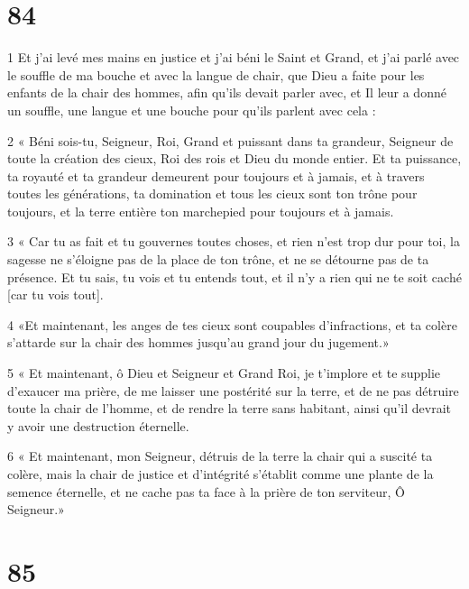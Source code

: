 \chapter{84}

\par 1 Et j'ai levé mes mains en justice et j'ai béni le Saint et Grand, et j'ai parlé avec le souffle de ma bouche et avec la langue de chair, que Dieu a faite pour les enfants de la chair des hommes, afin qu'ils devait parler avec, et Il leur a donné un souffle, une langue et une bouche pour qu'ils parlent avec cela :
\par 2 « Béni sois-tu, Seigneur, Roi, Grand et puissant dans ta grandeur, Seigneur de toute la création des cieux, Roi des rois et Dieu du monde entier. Et ta puissance, ta royauté et ta grandeur demeurent pour toujours et à jamais, et à travers toutes les générations, ta domination et tous les cieux sont ton trône pour toujours, et la terre entière ton marchepied pour toujours et à jamais.
\par 3 « Car tu as fait et tu gouvernes toutes choses, et rien n'est trop dur pour toi, la sagesse ne s'éloigne pas de la place de ton trône, et ne se détourne pas de ta présence. Et tu sais, tu vois et tu entends tout, et il n’y a rien qui ne te soit caché [car tu vois tout].
\par 4 «Et maintenant, les anges de tes cieux sont coupables d'infractions, et ta colère s'attarde sur la chair des hommes jusqu'au grand jour du jugement.»
\par 5 « Et maintenant, ô Dieu et Seigneur et Grand Roi, je t'implore et te supplie d'exaucer ma prière, de me laisser une postérité sur la terre, et de ne pas détruire toute la chair de l'homme, et de rendre la terre sans habitant, ainsi qu'il devrait y avoir une destruction éternelle.
\par 6 « Et maintenant, mon Seigneur, détruis de la terre la chair qui a suscité ta colère, mais la chair de justice et d'intégrité s'établit comme une plante de la semence éternelle, et ne cache pas ta face à la prière de ton serviteur, Ô Seigneur.»

\chapter{85}

